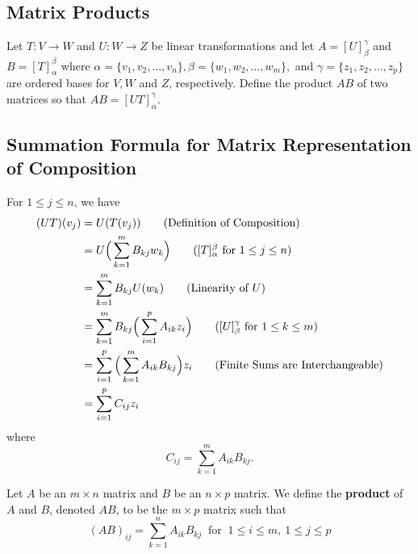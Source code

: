 \subsection{Matrix Products}

\begin{definition}
    Let \( T: V \to W  \) and \( U: W \to Z  \) be linear transformations and let \( A = [U]_{\beta}^{\gamma}  \) and \( B = [T]_{\alpha}^{\beta}  \) where \( \alpha = \{ {v}_{1}, {v}_{2}, \dots, {v}_{n}  \}, \beta = \{ {w}_{1}, {w}_{2}, \dots, {w}_{m} \},   \) and \( \gamma = \{ {z}_{1}, {z}_{2}, \dots,  {z}_{p} \}  \) are ordered bases for \( V, W  \) and \( Z  \), respectively. Define the product \( AB \) of two matrices so that \( AB = [UT]_{\alpha}^{\gamma}  \). 
\end{definition}

\subsection{Summation Formula for Matrix Representation of Composition}
For \( 1 \leq j \leq n \), we have
\begin{align*}
    (UT)({v}_{j}) &= U(T({v}_{j})) \tag{Definition of Composition} \\
              &= U \Big( \sum_{ k=1 }^{ m } {B}_{kj} {w}_{k } \Big) \tag{\( [T]_{\alpha}^{\beta}\) for \( 1 \leq j \leq n  \)} \\
              &= \sum_{ k=1 }^{ m } {B}_{kj} U({w}_{k }) \tag{Linearity of \( U \)}  \\
              &= \sum_{ k=1 }^{ m } {B}_{k j} \Big( \sum_{ i=1 }^{ p } {A}_{i k } {z}_{i} \Big) \tag{\( [U]_{\beta}^{\gamma}  \) for \( 1 \leq k \leq m  \)} \\  
              &= \sum_{ i=1 }^{ p  } \Big( \sum_{ k=1 }^{ m } {A}_{ik } {B}_{kj} \Big) {z}_{i} \tag{Finite Sums are Interchangeable} \\
              &= \sum_{ i=1  }^{ p } {C}_{ij} {z}_{i}
\end{align*}
where 
\[  {C}_{ij} = \sum_{ k=1 }^{ m } {A}_{ik } {B}_{kj}. \]

\begin{definition}
    Let \( A  \) be an \( m \times n  \) matrix and \( B  \) be an \( n \times p  \) matrix. We define the \textbf{product} of \( A  \) and \( B  \), denoted \( AB  \), to be the \( m \times p  \) matrix such that 
    \[  {(AB)}_{ij} = \sum_{ k=1 }^{ n } {A}_{ik } {B}_{kj } \ \text{ for } \ 1 \leq i \leq m , \  1 \leq j \leq p   \]
\end{definition}

